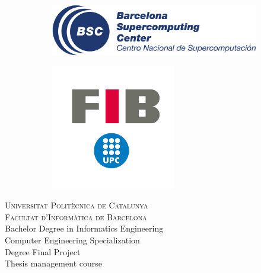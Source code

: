 \begin{titlepage}

  \newcommand{\HRule}{\rule{\linewidth}{0.5mm}}

  \begin{center}

    \begin{figure}
      \begin{subfigure}{0.5\textwidth}
        \centering
        \includegraphics[width=1\textwidth]{BSC-blue-large.png}
      \end{subfigure}
      \begin{subfigure}{0.5\textwidth}
        \centering
        \includegraphics[width=0.6\textwidth]{logo-fib.png}
      \end{subfigure}
    \end{figure}

    \textsc{\Large Universitat Politècnica de Catalunya}\\[0.1cm]
    \textsc{\large Facultat d'Informàtica de Barcelona}\\[0.4cm]
    {\large Bachelor Degree in Informatics Engineering}\\[0.1cm]
    {\large Computer Engineering Specialization}\\[0.1cm]
    {\large Degree Final Project}\\[0.1cm]
    {\large Thesis management course}\\[1cm]


\end{center}
\end{titlepage}

